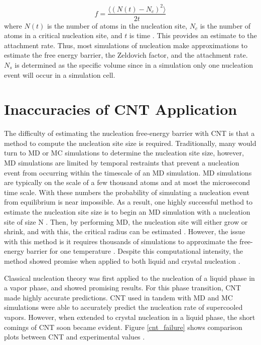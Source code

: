 \begin{equation}
	f = \frac{\langle (N(t) - N_c)^2\rangle}{2t}
\end{equation}
where $N(t)$ is the number of atoms in the nucleation site, $N_c$ is the number of atoms in a critical nucleation site, and $t$ is time \cite{Auer2001}\cite{Espinosa2016}.  This provides an estimate to the attachment rate.  Thus, most simulations of nucleation make approximations to estimate the free energy barrier, the Zeldovich factor, and the attachment rate.  $N_s$ is determined as the specific volume since in a simulation only one nucleation event will occur in a simulation cell.

\section{Inaccuracies of CNT Application}
The difficulty of estimating the nucleation free-energy barrier with CNT is that a method to compute the nucleation site size is required.  Traditionally, many would turn to MD or MC simulations to determine the nucleation site size, however, MD simulations are limited by temporal restraints that prevent a nucleation event from occurring within the timescale of an MD simulation.  MD simulations are typically on the scale of a few thousand atoms and at most the microsecond time scale.  With these numbers the probability of simulating a nucleation event from equilibrium is near impossible.  As a result, one highly successful method to estimate the nucleation site size is to begin an MD simulation with a nucleation site of size N \cite{Espinosa2016}\cite{Sanz2013}.  Then, by performing MD, the nucleation site will either grow or shrink, and with this, the critical radius can be estimated \cite{Espinosa2016}\cite{Sanz2013}.  However, the issue with this method is it requires thousands of simulations to approximate the free-energy barrier for one temperature \cite{Espinosa2016}.  Despite this computational intensity, the method showed promise when applied to both liquid and crystal nucleation \cite{Espinosa2016}.

Classical nucleation theory was first applied to the nucleation of a liquid phase in a vapor phase, and showed promising results.  For this phase transition, CNT made highly accurate predictions.  CNT used in tandem with MD and MC simulations were able to accurately predict the nucleation rate of supercooled vapors.  However, when extended to crystal nucleation in a liquid phase, the short comings of CNT soon became evident.  Figure \ref{cnt_failure} shows comparison plots between CNT and experimental values \cite{Vehkamaki2006}. 

